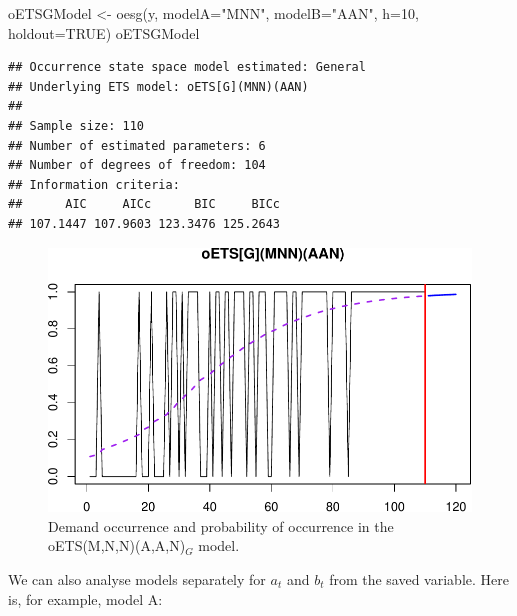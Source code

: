 \documentclass[
]{book}
\newenvironment{Shaded}{\begin{snugshade}}{\end{snugshade}}
\newcommand{\AttributeTok}[1]{\textcolor[rgb]{0.77,0.63,0.00}{#1}}
\newcommand{\ConstantTok}[1]{\textcolor[rgb]{0.00,0.00,0.00}{#1}}
\newcommand{\DecValTok}[1]{\textcolor[rgb]{0.00,0.00,0.81}{#1}}
\newcommand{\FunctionTok}[1]{\textcolor[rgb]{0.00,0.00,0.00}{#1}}
\newcommand{\NormalTok}[1]{#1}
\newcommand{\OtherTok}[1]{\textcolor[rgb]{0.56,0.35,0.01}{#1}}
\newcommand{\SpecialCharTok}[1]{\textcolor[rgb]{0.00,0.00,0.00}{#1}}
\newcommand{\StringTok}[1]{\textcolor[rgb]{0.31,0.60,0.02}{#1}}
\theoremstyle{definition}
\theoremstyle{definition}
\theoremstyle{definition}
\theoremstyle{definition}
\theoremstyle{remark}
\begin{document}
\begin{Shaded}
\begin{Highlighting}[]
\NormalTok{oETSGModel }\OtherTok{\textless{}{-}} \FunctionTok{oesg}\NormalTok{(y, }\AttributeTok{modelA=}\StringTok{"MNN"}\NormalTok{, }\AttributeTok{modelB=}\StringTok{"AAN"}\NormalTok{,}
                    \AttributeTok{h=}\DecValTok{10}\NormalTok{, }\AttributeTok{holdout=}\ConstantTok{TRUE}\NormalTok{)}
\NormalTok{oETSGModel}
\end{Highlighting}
\end{Shaded}

\begin{verbatim}
## Occurrence state space model estimated: General
## Underlying ETS model: oETS[G](MNN)(AAN)
## 
## Sample size: 110
## Number of estimated parameters: 6
## Number of degrees of freedom: 104
## Information criteria: 
##      AIC     AICc      BIC     BICc 
## 107.1447 107.9603 123.3476 125.2643
\end{verbatim}

\begin{figure}
\centering
\includegraphics{Svetunkov--2022----ADAM_files/figure-latex/oETSGModel-1.pdf}
\caption{\label{fig:oETSGModel}Demand occurrence and probability of occurrence in the oETS(M,N,N)(A,A,N)\(_G\) model.}
\end{figure}

We can also analyse models separately for \(a_t\) and \(b_t\) from the saved variable. Here is, for example, model A:

\begin{Shaded}
\end{Shaded}
\end{document}
